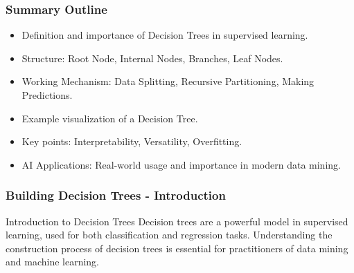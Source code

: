 \documentclass[aspectratio=169]{beamer}
\begin{document}
\begin{frame}[fragile]
    \frametitle{Summary Outline}
    \begin{itemize}
        \item Definition and importance of Decision Trees in supervised learning.
        \item Structure: Root Node, Internal Nodes, Branches, Leaf Nodes.
        \item Working Mechanism: Data Splitting, Recursive Partitioning, Making Predictions.
        \item Example visualization of a Decision Tree.
        \item Key points: Interpretability, Versatility, Overfitting.
        \item AI Applications: Real-world usage and importance in modern data mining.
    \end{itemize}
\end{frame}

\begin{frame}[fragile]
    \frametitle{Building Decision Trees - Introduction}
    \begin{block}{Introduction to Decision Trees}
        Decision trees are a powerful model in supervised learning, used for both classification and regression tasks.
        Understanding the construction process of decision trees is essential for practitioners of data mining and machine learning.
    \end{block}
\end{frame}
\end{document}
